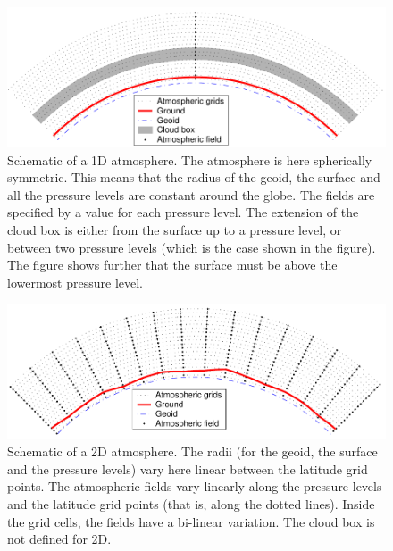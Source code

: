 \begin{figure}[!t]
 \begin{center}
  \includegraphics*[width=0.98\hsize]{Figs/fm_definitions/atm_dim_1d}
  \caption{Schematic of a 1D atmosphere. The atmosphere is 
    here spherically symmetric. This means that the radius of the
    geoid, the surface and all the pressure levels are constant
    around the globe. The fields are specified by a value for each
    pressure level. The extension of the cloud box is either from
    the surface up to a pressure level, or between two pressure
    levels (which is the case shown in the figure). The figure shows
    further that the surface must be above the lowermost pressure
    level. }
  \label{fig:fm_defs:1d}  
 \end{center}
\end{figure}

\begin{figure}[!t]
 \begin{center}
  \includegraphics*[width=0.98\hsize]{Figs/fm_definitions/atm_dim_2d}
  \caption{Schematic of a 2D atmosphere. The radii (for the geoid, the surface
    and the pressure levels) vary here linear between the latitude
    grid points. The atmospheric fields vary linearly along the
    pressure levels and the latitude grid points (that is, along the
    dotted lines). Inside the grid cells, the fields have a bi-linear
    variation. The cloud box is not defined for 2D.  }
  \label{fig:fm_defs:2d}
 \end{center}
\end{figure}

